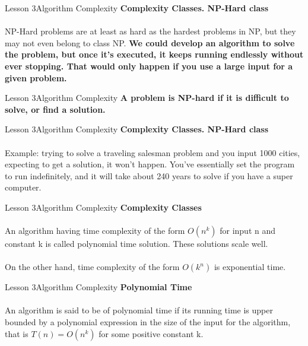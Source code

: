 \documentclass[aspectratio=1610]{beamer}
\begin{document}
\begin{frame}{Lesson 3}{Algorithm Complexity}
\LARGE
\textbf{Complexity Classes. NP-Hard class}\\~\\
\Large
NP-Hard problems are at least as hard as the hardest problems in NP, but they may
not even belong to class NP. 
\textbf{We could develop an algorithm to solve the problem, but once it’s
executed, it keeps running endlessly without ever stopping. That would only 
happen if you use a large input for a given problem.}
\end{frame}


\begin{frame}{Lesson 3}{Algorithm Complexity}
\LARGE
\textbf{A problem is NP-hard if it is difficult to solve, or find a solution.}
\end{frame}





\begin{frame}{Lesson 3}{Algorithm Complexity}
\LARGE
\textbf{Complexity Classes. NP-Hard class}\\~\\
\Large
Example: trying to solve a traveling salesman problem and you input 1000 cities,
expecting to get a solution, it won’t happen. You’ve essentially set the program
to run indefinitely, and it will take about 240 years to solve if you have a super
computer.
\end{frame}



\begin{frame}{Lesson 3}{Algorithm Complexity}
\LARGE
\textbf{Complexity Classes}\\~\\
\Large
An algorithm having time complexity of the form $O(n^k)$ for input n
and constant k is called polynomial time solution. These solutions scale well.
\\~\\
On the other hand, time complexity of the form $O(k^n)$ is exponential time.
\end{frame}



\begin{frame}{Lesson 3}{Algorithm Complexity}
\LARGE
\textbf{Polynomial Time}\\~\\
\Large
An algorithm is said to be of polynomial time if its running time is upper bounded
by a \alert{polynomial} expression in the size of the input for the algorithm,
that is $T(n) = O(n^k)$ for some positive constant k.
\end{frame}
\end{document}
